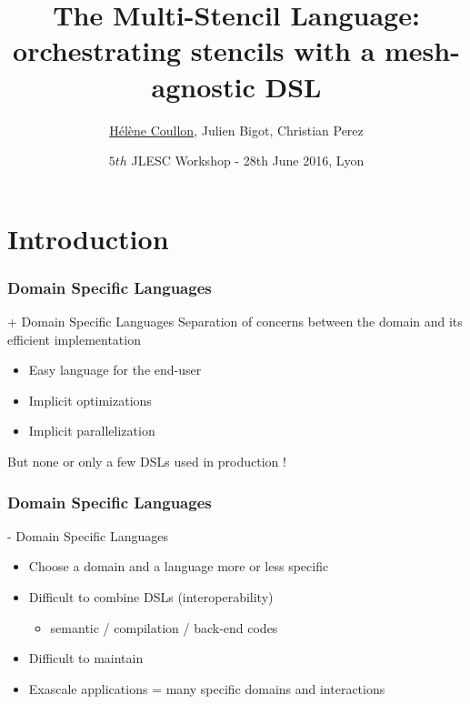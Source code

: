 \documentclass{beamer}
\title[The Multi-Stencil Language]{The Multi-Stencil Language: orchestrating stencils with a mesh-agnostic DSL}
\author[Hélène Coullon (INRIA), Julien Bigot (CEA), Christian Perez (INRIA)]{\underline{Hélène Coullon}, Julien Bigot, Christian Perez}
\institute[INRIA]{INRIA team Avalon\\Maison de la simulation (CEA)}
\date{$5{th}$ JLESC Workshop - 28th June 2016, Lyon}
\begin{document}

\begin{frame}
    \titlepage
\end{frame}

\section{Introduction}
\begin{frame}
\frametitle{Domain Specific Languages} %
\begin{block}{+ Domain Specific Languages}
Separation of concerns between the domain and its efficient implementation
\begin{itemize}
\item Easy language for the end-user
\item Implicit optimizations
\item Implicit parallelization
\end{itemize}
\end{block}
But none or only a few DSLs used in production !
\end{frame}
\begin{frame}
\frametitle{Domain Specific Languages} %
\begin{alertblock}{- Domain Specific Languages}
\begin{itemize}
\item Choose a domain and a language more or less specific
\item Difficult to combine DSLs (interoperability)
\begin{itemize}
\item semantic / compilation / back-end codes
\end{itemize}
\item Difficult to maintain
\item Exascale applications = many specific domains and interactions
\end{itemize}
\end{alertblock}
\end{frame}
\end{document}
